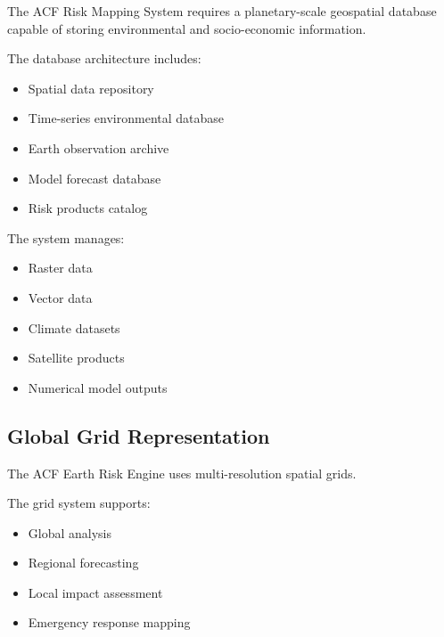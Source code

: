 The ACF Risk Mapping System requires a planetary-scale geospatial
database capable of storing environmental and socio-economic information.

The database architecture includes:

\begin{itemize}

\item Spatial data repository

\item Time-series environmental database

\item Earth observation archive

\item Model forecast database

\item Risk products catalog

\end{itemize}


The system manages:

\begin{itemize}

\item Raster data

\item Vector data

\item Climate datasets

\item Satellite products

\item Numerical model outputs

\end{itemize}



\subsection{Global Grid Representation}

The ACF Earth Risk Engine uses multi-resolution spatial grids.

The grid system supports:

\begin{itemize}

\item Global analysis

\item Regional forecasting

\item Local impact assessment

\item Emergency response mapping

\end{itemize}


